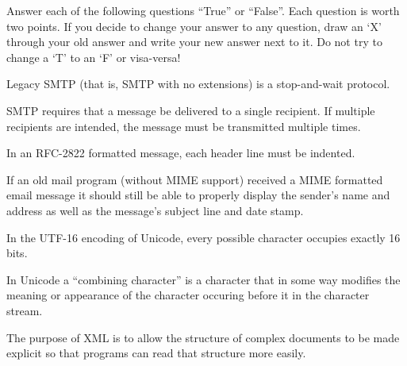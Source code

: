 \documentclass[12pt]{examdesign}
\begin{document}
\begin{truefalse}
  
  Answer each of the following questions ``True'' or ``False''. Each question is worth two
  points. If you decide to change your answer to any question, draw an `X' through your old
  answer and write your new answer next to it. Do not try to change a `T' to an `F' or
  visa-versa!

  \begin{question}
     Legacy SMTP (that is, SMTP with no extensions) is a stop-and-wait protocol.
  \end{question}
  
  \begin{question}
     SMTP requires that a message be delivered to a single recipient. If multiple
    recipients are intended, the message must be transmitted multiple times.
  \end{question}

  \begin{question}
     In an RFC-2822 formatted message, each header line must be indented.
  \end{question}

  \begin{question}
     If an old mail program (without MIME support) received a MIME formatted email
    message it should still be able to properly display the sender's name and address as well as
    the message's subject line and date stamp.
  \end{question}

  \begin{question}
     In the UTF-16 encoding of Unicode, every possible character occupies exactly
    16 bits.
  \end{question}
  
  \begin{question}
     In Unicode a ``combining character'' is a character that in some way modifies
    the meaning or appearance of the character occuring before it in the character stream.
  \end{question}


  \begin{question}
     The purpose of XML is to allow the structure of complex documents to be made
    explicit so that programs can read that structure more easily.
  \end{question}


\end{truefalse}
\end{document}
